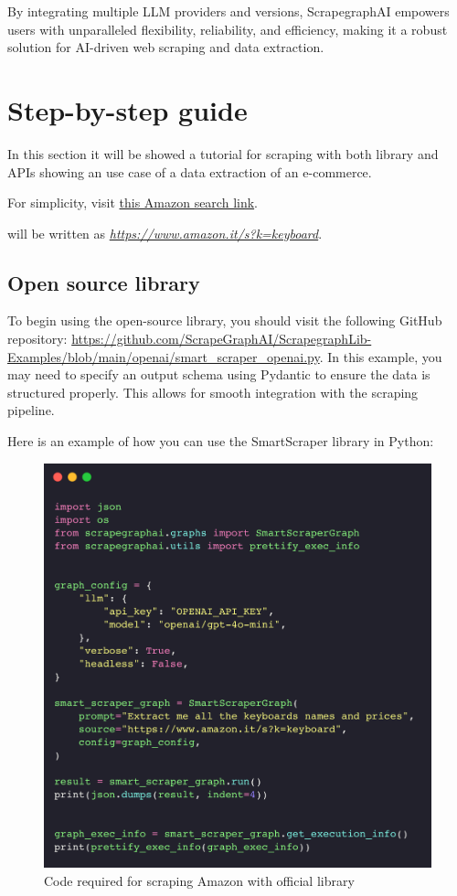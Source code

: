 By integrating multiple LLM providers and versions, ScrapegraphAI empowers users with unparalleled flexibility, reliability, and efficiency, making it a robust solution for AI-driven web scraping and data extraction.
\section{Step-by-step guide}
In this section it will be showed a tutorial for scraping with both library and APIs showing an use case of a data extraction of an e-commerce.

For simplicity, visit \href{https://www.amazon.it/s?k=keyboard&__mk_it_IT=%C3%85%C3%85%C5%BD%C3%95%C3%91&crid=2NTE6199MWOQE&sprefix=keyboar%2Caps%2C114&ref=nb_sb_noss_2V}{this Amazon search link}.

will be written as \textit{\url{https://www.amazon.it/s?k=keyboard}}.

\subsection{Open source library}

To begin using the open-source library, you should visit the following GitHub repository: \url{https://github.com/ScrapeGraphAI/ScrapegraphLib-Examples/blob/main/openai/smart_scraper_openai.py}. In this example, you may need to specify an output schema using Pydantic to ensure the data is structured properly. This allows for smooth integration with the scraping pipeline.

Here is an example of how you can use the SmartScraper library in Python:

\begin{figure}[h!]
    \centering
    \includegraphics[width=0.95\linewidth]{Assets/library.png}
    \caption{Code required for scraping Amazon with official library}
    \label{fig:enter-label}
\end{figure}

